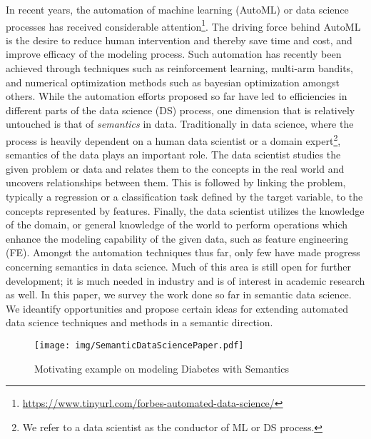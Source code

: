 \documentclass[sigconf]{acmart}
\begin{document}
In recent years, the automation of machine learning (AutoML) or data science processes has received considerable attention\footnote{\url{ https://www.tinyurl.com/forbes-automated-data-science/}\hspace{0.2cm}}.%
The driving force behind AutoML is the desire to reduce human intervention and thereby save time and cost, and improve efficacy of the modeling process. Such automation has recently been achieved through techniques such as reinforcement learning, multi-arm bandits, and numerical optimization methods such as bayesian optimization amongst others. 
While the automation efforts proposed so far have led to efficiencies in different parts of the data science (DS) process, one dimension that is relatively untouched is that of {\em semantics} in data. Traditionally in data science, where the process is heavily dependent on a human data scientist or a domain expert\footnote{We refer to a data scientist as the conductor of ML or DS process.}, semantics of the data plays an important role. The data scientist studies the given problem or data and relates them to the concepts in the real world and uncovers relationships between them. This is followed by linking the problem, typically a regression or a classification task defined by the target variable, to the concepts represented by features. Finally, the data scientist utilizes the knowledge of the domain, or general knowledge of the world to perform operations which enhance the modeling capability of the given data, such as feature engineering (FE). 
Amongst the automation techniques thus far, only few have made progress concerning semantics in data science. Much of this area is still open for further development; it is much needed in industry and is of interest in academic research as well. In this paper, we survey the work done so far in semantic data science. We ideantify opportunities and propose certain ideas for extending automated data science techniques and methods in a semantic direction.



\begin{figure}
    \centering
    \texttt{[image: img/SemanticDataSciencePaper.pdf]}
    \caption{Motivating example on modeling Diabetes with Semantics}
    \label{fig:example}
\end{figure}
\end{document}

